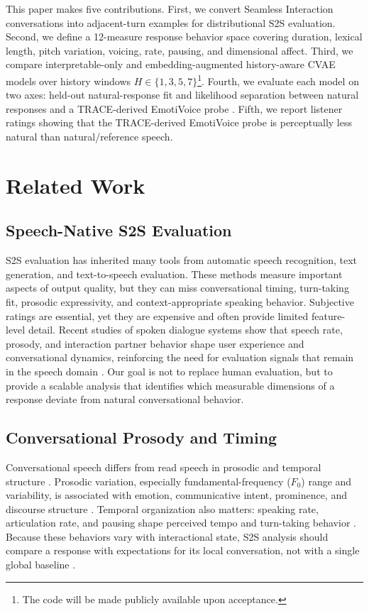\documentclass[conference]{IEEEtran}
\begin{document}
This paper makes five contributions.
First, we convert Seamless Interaction conversations into adjacent-turn examples for distributional S2S evaluation.
Second, we define a 12-measure response behavior space covering duration, lexical length, pitch variation, voicing, rate, pausing, and dimensional affect.
Third, we compare interpretable-only and embedding-augmented history-aware CVAE models over history windows $H\in\{1,3,5,7\}$\footnote{The code will be made publicly available upon acceptance.}.
Fourth, we evaluate each model on two axes: held-out natural-response fit and likelihood separation between natural responses and a TRACE-derived EmotiVoice probe \cite{TRACE}.
Fifth, we report listener ratings showing that the TRACE-derived EmotiVoice probe is perceptually less natural than natural/reference speech.

\section{Related Work}
\subsection{Speech-Native S2S Evaluation}
S2S evaluation has inherited many tools from automatic speech recognition, text generation, and text-to-speech evaluation.
These methods measure important aspects of output quality, but they can miss conversational timing, turn-taking fit, prosodic expressivity, and context-appropriate speaking behavior.
Subjective ratings are essential, yet they are expensive and often provide limited feature-level detail.
Recent studies of spoken dialogue systems show that speech rate, prosody, and interaction partner behavior shape user experience and conversational dynamics, reinforcing the need for evaluation signals that remain in the speech domain \cite{dowding_user_2024, xie_speaking_2024, jung_comparison_2025}.
Our goal is not to replace human evaluation, but to provide a scalable analysis that identifies which measurable dimensions of a response deviate from natural conversational behavior.

\subsection{Conversational Prosody and Timing}
Conversational speech differs from read speech in prosodic and temporal structure \cite{howell1991comparison, hazan2010does}.
Prosodic variation, especially fundamental-frequency ($F_0$) range and variability, is associated with emotion, communicative intent, prominence, and discourse structure \cite{banziger_role_2005, pell_emotional_2011, xu_speech_2005, sluijter_acoustic_1996, sluijter_spectral_1996}.
Temporal organization also matters: speaking rate, articulation rate, and pausing shape perceived tempo and turn-taking behavior \cite{tauroza_speech_1990, goldman1958speech, campione2002large, pellegrino_automatic_2004, jiao_estimating_2015, morgan_combining_1998}.
Because these behaviors vary with interactional state, S2S analysis should compare a response with expectations for its local conversation, not with a single global baseline \cite{fusaroli_dialog_2014, wynn_conversational_2024}.
\end{document}
